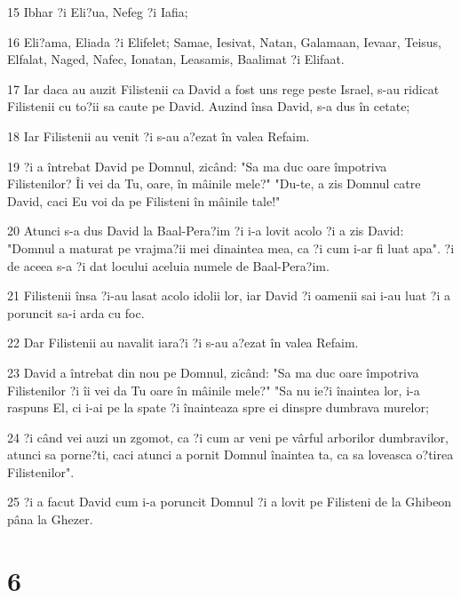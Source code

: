 \par 15 Ibhar ?i Eli?ua, Nefeg ?i Iafia;
\par 16 Eli?ama, Eliada ?i Elifelet; Samae, Iesivat, Natan, Galamaan, Ievaar, Teisus, Elfalat, Naged, Nafec, Ionatan, Leasamis, Baalimat ?i Elifaat.
\par 17 Iar daca au auzit Filistenii ca David a fost uns rege peste Israel, s-au ridicat Filistenii cu to?ii sa caute pe David. Auzind însa David, s-a dus în cetate;
\par 18 Iar Filistenii au venit ?i s-au a?ezat în valea Refaim.
\par 19 ?i a întrebat David pe Domnul, zicând: "Sa ma duc oare împotriva Filistenilor? Îi vei da Tu, oare, în mâinile mele?" "Du-te, a zis Domnul catre David, caci Eu voi da pe Filisteni în mâinile tale!"
\par 20 Atunci s-a dus David la Baal-Pera?im ?i i-a lovit acolo ?i a zis David: "Domnul a maturat pe vrajma?ii mei dinaintea mea, ca ?i cum i-ar fi luat apa". ?i de aceea s-a ?i dat locului aceluia numele de Baal-Pera?im.
\par 21 Filistenii însa ?i-au lasat acolo idolii lor, iar David ?i oamenii sai i-au luat ?i a poruncit sa-i arda cu foc.
\par 22 Dar Filistenii au navalit iara?i ?i s-au a?ezat în valea Refaim.
\par 23 David a întrebat din nou pe Domnul, zicând: "Sa ma duc oare împotriva Filistenilor ?i îi vei da Tu oare în mâinile mele?" "Sa nu ie?i înaintea lor, i-a raspuns El, ci i-ai pe la spate ?i înainteaza spre ei dinspre dumbrava murelor;
\par 24 ?i când vei auzi un zgomot, ca ?i cum ar veni pe vârful arborilor dumbravilor, atunci sa porne?ti, caci atunci a pornit Domnul înaintea ta, ca sa loveasca o?tirea Filistenilor".
\par 25 ?i a facut David cum i-a poruncit Domnul ?i a lovit pe Filisteni de la Ghibeon pâna la Ghezer.

\chapter{6}

